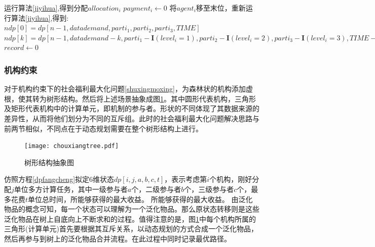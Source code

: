 \documentclass[promaster]{thesis-uestc}
\begin{document}

\begin{algorithm}[h]
    运行算法\ref{jiyihua},得到分配$allocation_i$\;
    {
        $payment_i \leftarrow 0$\;
        将$agent_i$移至末位，重新运行算法\ref{jiyihua},得到:\;
        $ndp[0] = dp[n-1,datademand,parti_1,parti_2,parti_3,TIME]$\;
        $ndp[k] = dp[n-1,datademand-k,parti_1-\mathbf{I}(level_i=1),parti_2-\mathbf{I}(level_i=2),parti_3-\mathbf{I}(level_i=3),TIME-k*timeperunit_i-transmitcost_i],1\leq k\leq datacount_i$\;
        $record \leftarrow 0$\;
    }
\caption{指标集约束问题价格规则}
\label{dp_zhifu}
\end{algorithm}


\FloatBarrier

\subsubsection{机构约束}
对于机构约束下的社会福利最大化问题\ref{shuxingmoxing}，为森林状的机构添加虚根，使其转为树形结构。然后将上述场景抽象成图\ref{chouxiangtree}。其中圆形代表机构，三角形及矩形代表机构中的计算单元，即机制的参与者。形状的不同体现了其数据来源的差异性，从而将他们划分为不同的互斥组。此时的社会福利最大化问题解决思路与前两节相似，不同点在于动态规划需要在整个树形结构上进行。

\begin{figure}[h]
    \texttt{[image: chouxiangtree.pdf]}
    \caption{树形结构抽象图}
    \label{chouxiangtree}
\end{figure}

仿照方程\ref{dpfangcheng}拟定6维状态$dp[i,j,a,b,c,t]$，表示考虑第$i$个机构，刚好分配$j$单位多方计算任务，其中一级参与者$a$个，二级参与者$b$个，三级参与者$c$个，最多花费$t$单位总时间，所能够获得的最大收益。
所能够获得的最大收益。
由泛化物品的概念可知，每一个状态可以理解为一个泛化物品。那么原状态转移则是这些泛化物品在树上自底向上不断求和的过程。值得注意的是，图\ref{chouxiangtree}中每个机构所属的三角形(计算单元)首先要根据其互斥关系，以动态规划的方式合成一个泛化物品，然后再参与到树上的泛化物品合并流程。在此过程中同时记录最优路径。
\end{document}
